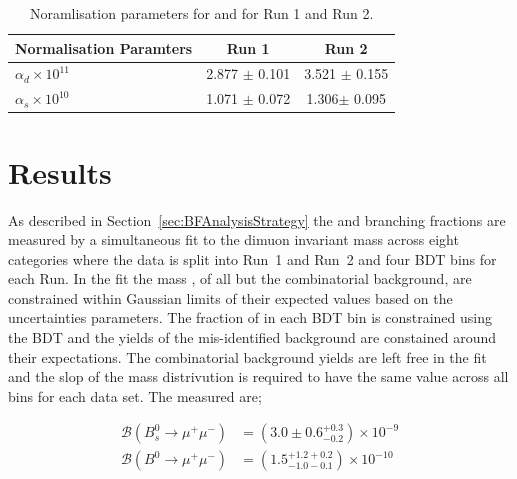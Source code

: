 {\begin{table}[htbp]
\begin{center}
\begin{tabular}{lcc}
\hline
Normalisation Paramters & Run 1 & Run 2 \\ \hline
$\alpha_{d} \times 10^{11}$ & 2.877 $\pm$ 0.101 & 3.521 $\pm$ 0.155 \\ %
$\alpha_{s} \times 10^{10}$ & 1.071 $\pm$ 0.072 & 1.306$ \pm$ 0.095 \\
\hline
\end{tabular}
\vspace{0.7cm}
\caption{Noramlisation parameters for \bsmumu and \bdmumu for Run 1 and Run 2.}
\label{tab:normparams}
\end{center}
\vspace{-1.0cm}
\end{table}


\section{Results}
\label{sec:BFResults}

As described in Section~\ref{sec:BFAnalysisStrategy} the \bsmumu and \bdmumu branching fractions are measured by a simultaneous fit to the dimuon invariant mass across eight categories where the data is split into Run~1 and Run~2 and four BDT bins for each Run.
In the fit the mass \pdfs, of all but the combinatorial background, are constrained within Gaussian limits of their expected values based on the uncertainties \pdf parameters. 
The fraction of \bmumu in each BDT bin is constrained using the BDT \pdf and the yields of the mis-identified background are constained around their expectations. The combinatorial background yields are left free in the fit and the slop of the mass distrivution is required to have the same value across all bins for each data set.
The measured \BFs are;

\begin{equation}
\begin{split}
  \mathcal{B}(B^{0}_{s} \to \mu^{+} \mu^{-}) &= (3.0 \pm 0.6^{+0.3}_{-0.2}) \times 10^{-9} \\
  \mathcal{B}(B^{0} \to \mu^{+} \mu^{-}) &= (1.5^{+1.2 +0.2}_{-1.0 -0.1})    \times 10^{-10} 
\end{split}
\label{eq:BFresults}
\end{equation}

}
